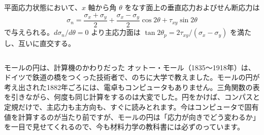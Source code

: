 \begin{senmonsho}[材料力学の教科書ふうの書き方]
\begin{bkhonbun}
平面応力状態において、$x$ 軸から角 $\theta$ をなす面上の垂直応力およびせん断応力は
\[\sigma_n=\frac{\sigma_x+\sigma_y}{2}+\frac{\sigma_x-\sigma_y}{2}\cos2\theta+\tau_{xy}\sin2\theta\tag{3.4}\]
で与えられる。$d\sigma_n/d\theta=0$ より主応力面は $\tan2\theta_p=2\tau_{xy}/(\sigma_x-\sigma_y)$ を満たし、互いに直交する。
\end{bkhonbun}
\end{senmonsho}

\begin{column}{モールの円は、計算機のかわりだった}
オットー・モール（1835〜1918年）は、ドイツで鉄道の橋をつくった技術者で、のちに大学で教えました。モールの円が考え出された1882年ごろには、電卓もコンピュータもありません。三角関数の表を引きながら、何度も同じ計算をするのは大変でした。円をかけば、コンパスと定規だけで、主応力も主方向も、すぐに読みとれます。今はコンピュータで固有値を計算するのが当たり前ですが、モールの円は「応力が向きでどう変わるか」を一目で見せてくれるので、今も材料力学の教科書には必ずのっています。
\end{column}


